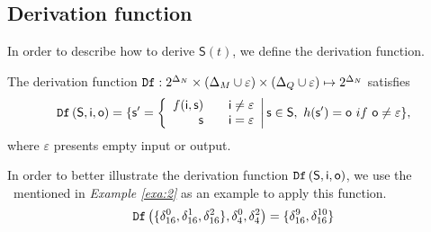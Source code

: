 

\subsection{Derivation function}
In order to describe how to derive $\mathsf{S}(t)$, we define the derivation function. %
\begin{definition} 
The derivation function 
${\tt Df}:2^{\Delta_N}\times (\Delta_M\cup\varepsilon) \times (\Delta_Q\cup\varepsilon) \mapsto 2^{\Delta_N}$
satisfies
\[\Ded\left( \mathsf{S},  \mathsf{i},  \mathsf{o}\right)
=\{ \mathsf{s}'=\left\{
\begin{array}{rcl}
f( \mathsf{i}, \mathsf{s})      &      & {\mathsf{i}\neq \varepsilon}\\
\mathsf{s}       &      & {\mathsf{i}= \varepsilon}
\end{array} \right |\mathsf{s} \in \mathsf{S}, \ h(\mathsf{s}')=\mathsf{o}\ if\ \mathsf{o}\neq \varepsilon\},\]
where $\varepsilon$ presents empty input or output.
\end{definition}

\begin{example}
 In order to better illustrate the derivation function ${\tt Df}\left( \mathsf{S},  \mathsf{i},  \mathsf{o}\right)$, we use the \BCN\ mentioned in {\em Example \ref{exa:2}} as an example to apply this function. \[{\tt Df}\left(\{\delta_{16}^0,\delta_{16}^1,\delta_{16}^2\},\delta_4^0,\delta_4^2\right)=\{\delta_{16}^{9},\delta_{16}^{10}\}\]
 \label{exa:8}
 \end{example}   
 
